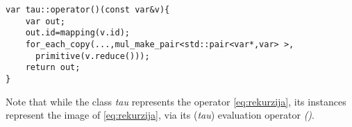 \begin{lstlisting}
var tau::operator()(const var&v){
    var out;
    out.id=mapping(v.id);
    for_each_copy(...,mul_make_pair<std::pair<var*,var> >, 
      primitive(v.reduce()));
    return out;
}
\end{lstlisting}
Note that while the class \emph{tau} represents the operator \eqref{eq:rekurzija}, its instances represent the image of \eqref{eq:rekurzija}, via its (\emph{tau}) evaluation operator \emph{()}.
